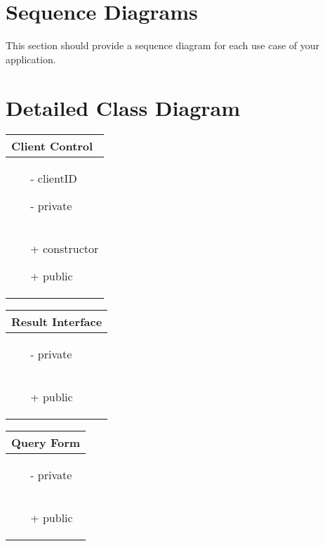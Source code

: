\documentclass[]{article}
\begin{document}
\section{Sequence Diagrams}
\label{sec:sequence_diagrams}
This section should provide a sequence diagram for each use case of your application.

\section{Detailed Class Diagram}
\label{sec:detailed_class_diagram}
\begin{table}[H]
\centering %
\begin{tabular}{|>{\centering\arraybackslash}p{10cm}|} %
\hline
Client Control\\
\hline
\begin{itemize}
\item[-] clientID
\item[-] private
\end{itemize}
\\
\hline
\begin{itemize}
\item[+] constructor
\item[+] public
\end{itemize}
\\
\hline
\end{tabular}
\end{table}
%
\begin{table}[H]
\centering
\begin{tabular}{|>{\centering\arraybackslash}p{10cm}|}
\hline
Result Interface\\
\hline
\begin{itemize}
\item[-] private
\end{itemize}
\\
\hline
\begin{itemize}
\item[+] public
\end{itemize}
\\
\hline
\end{tabular}
\end{table}
%
\begin{table}[H]
\centering
\begin{tabular}{|>{\centering\arraybackslash}p{10cm}|}
\hline
Query Form\\
\hline
\begin{itemize}
\item[-] private
\end{itemize}
\\
\hline
\begin{itemize}
\item[+] public
\end{itemize}
\\
\hline
\end{tabular}
\end{table}
\end{document}
